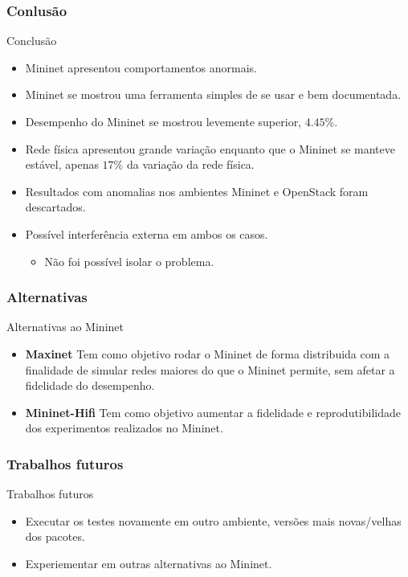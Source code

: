 \documentclass{beamer}
\begin{document}
\begin{frame} \frametitle{Conlusão}

    Conclusão

    \begin{itemize}
        \item Mininet apresentou comportamentos anormais.
        \item Mininet se mostrou uma ferramenta simples de se usar e bem documentada.
        \item Desempenho do Mininet se mostrou levemente superior, $4.45\%$.
        \item Rede física apresentou grande variação enquanto que o Mininet se manteve estável, apenas $17\%$ da variação da rede física.
        \item Resultados com anomalias nos ambientes Mininet e OpenStack foram descartados.
        \item Possível interferência externa em ambos os casos.
        \begin{itemize}
            \item Não foi possível isolar o problema.
        \end{itemize}
    \end{itemize}
\end{frame}

\begin{frame}
    \frametitle{Alternativas}

    Alternativas ao Mininet

    \begin{itemize}
        \item \textbf{Maxinet} Tem como objetivo rodar o Mininet de forma distribuida com a finalidade de simular
            redes maiores do que o Mininet permite, sem afetar a fidelidade do desempenho.

        \item \textbf{Mininet-Hifi} Tem como objetivo aumentar a fidelidade e reprodutibilidade dos experimentos
            realizados no Mininet.
    \end{itemize}
\end{frame}

\begin{frame}
    \frametitle{Trabalhos futuros}

    Trabalhos futuros

    \begin{itemize}
        \item Executar os testes novamente em outro ambiente, versões mais novas/velhas dos pacotes.
        \item Experiementar em outras alternativas ao Mininet.
    \end{itemize}
\end{frame}
\end{document}
